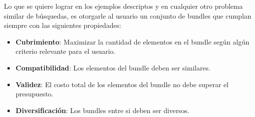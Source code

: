 Lo que se quiere lograr en los ejemplos descriptos y en cualquier otro problema similar de búsquedas, es otorgarle al usuario un conjunto de bundles que cumplan siempre con las siguientes propiedades: 
\begin{itemize}
  \item \textbf{Cubrimiento}: Maximizar la cantidad de elementos en el bundle según algún criterio relevante para el usuario.
  \item \textbf{Compatibilidad}: Los elementos del bundle deben ser similares.
  \item \textbf{Validez}: El costo total de los elementos del bundle no debe superar el presupuesto.
  \item \textbf{Diversificación}: Los bundles entre si deben ser diversos.
\end{itemize}
